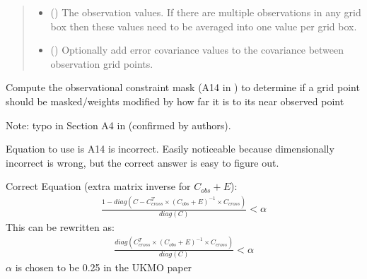 \documentclass[letterpaper,10pt,english]{sphinxmanual}
\begin{document}
\begin{fulllineitems}
\begin{quote}
\begin{description}
\begin{itemize}
\item {}
\sphinxAtStartPar
{} () \textendash{} The observation values. If there are multiple observations in any
grid box then these values need to be averaged into one value per
grid box.

\item {}
\sphinxAtStartPar
{} (\sphinxstyleliteralemphasis{\sphinxupquote{ | }}) \textendash{} Optionally add error covariance values to the covariance between
observation grid points.

\end{itemize}

\end{description}\end{quote}

\begin{fulllineitems}
\label{\detokenize{kriging:glomar_gridding.kriging.OrdinaryKriging.constraint_mask}}
\pysigstartsignatures
\pysiglinewithargsret
{}
{}
{}
\pysigstopsignatures
\sphinxAtStartPar
Compute the observational constraint mask (A14 in ) to
determine if a grid point should be masked/weights modified by how far
it is to its near observed point

\sphinxAtStartPar
Note: typo in Section A4 in  (confirmed by authors).

\sphinxAtStartPar
Equation to use is A14 is incorrect. Easily noticeable because
dimensionally incorrect is wrong, but the correct answer is easy to
figure out.

\sphinxAtStartPar
Correct Equation (extra matrix inverse for \(C_{obs} + E\)):
\begin{equation*}
\begin{split}\frac{
    1 - diag(C - C_{cross}^T \times (C_{obs} + E)^{-1}
             \times C_{cross})
}{diag(C)} < \alpha\end{split}
\end{equation*}
\sphinxAtStartPar
This can be re\sphinxhyphen{}written as:
\begin{equation*}
\begin{split}\frac{
    diag(C_{cross}^T \times (C_{obs} + E)^{-1} \times C_{cross})
}{diag(C)} < \alpha\end{split}
\end{equation*}
\sphinxAtStartPar
\(\alpha\) is chosen to be 0.25 in the UKMO paper


\end{fulllineitems}
\end{fulllineitems}
\end{document}

